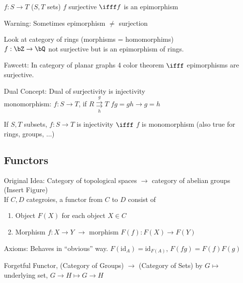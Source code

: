 \begin{example}
    $f: S \to T$ ($S,T$ sets) $f$ surjective $\ifff f$ is an epimorphism 
\end{example}

\noindent
Warning: Sometimes epimorphism $\neq$ surjection 

\begin{example}
    Look at category of rings (morphisms = homomorphims) \\
    $f: \bZ \to \bQ$ not surjective but is an epimorphism of rings.  
\end{example}

\noindent
Fawcett: In category of planar graphs 4 color theorem $\ifff$ epimorphisms are surjective. 

\noindent
Dual Concept: Dual of surjectivity is injectivity \\
monomorphism: $f: S \to T$, if $R \overset{g}{\underset{h}{\rightrightarrows}} T$ $fg = gh \to g=h$ 

\begin{example}
    If $S, T$ subsets, $f: S \to T$ is injectivity $\ifff$ $f$ is monomorphism (also true for rings, groups, $\ldots$)
\end{example}

\subsection{Functors} 

Original Idea: Category of topological spaces $\to$ category of abelian groups \\

(Insert Figure) \\ 

\noindent
If $C, D$ categroies, a functor from $C$ to $D$ consist of 
\begin{enumerate}
    \item Object $F(X)$ for each object $X \in C$ 
    \item Morphism $f: X \to Y$ $\to$ morphism $F(f): F(X) \to F(Y)$ 
\end{enumerate}
Axioms: Behaves in ``obvious'' way. $F(\text{id}_A) = \text{id}_{F(A)}$, $F(fg) = F(f)F(g)$ 

\begin{example}
    Forgetful Functor, (Category of Groups) $\to$ (Category of Sets) by $G \mapsto$ underlying set, $G \to H \mapsto G \to H$ 
\end{example}